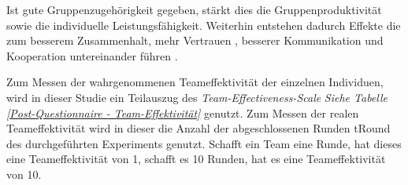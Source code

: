 \documentclass[a4paper,11pt]{article}%
\renewcommand{\\}{\vspace*{0.5\baselineskip} \newline}
\begin{document}
Ist gute Gruppenzugehörigkeit gegeben, stärkt dies die Gruppenproduktivität sowie die individuelle Leistungsfähigkeit. Weiterhin entstehen dadurch Effekte die zum besserem Zusammenhalt, mehr Vertrauen \citep{herbsleb2000distance}, besserer Kommunikation und Kooperation untereinander führen \citep[p. 510]{olson2003psychological}.

Zum Messen der wahrgenommenen Teameffektivität der einzelnen Individuen, wird in dieser Studie ein Teilauszug des \textit{Team-Effectiveness-Scale} \textit{Siehe Tabelle \ref{Post-Questionnaire - Team-Effektivität}} \citep[p.469]{gibson2003team} genutzt. Zum Messen der realen Teameffektivität wird in dieser die Anzahl der abgeschlossenen Runden \ac{tRound} des durchgeführten Experiments genutzt. Schafft ein Team eine Runde, hat dieses eine Teameffektivität von 1, schafft es 10 Runden, hat es eine Teameffektivität von 10.
%	
\end{document}
